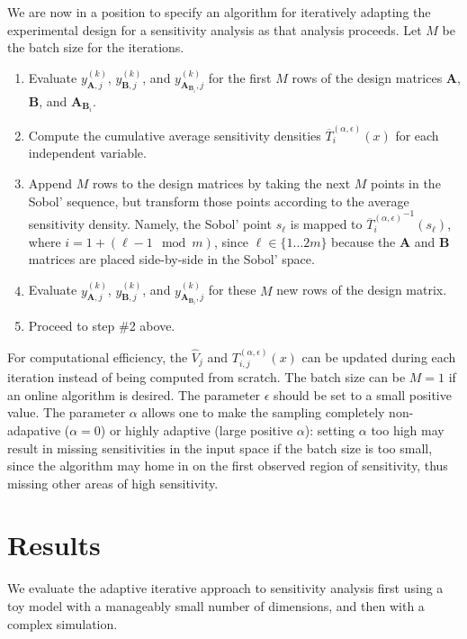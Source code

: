 \documentclass[12pt]{article}
\begin{document}
We are now in a position to specify an algorithm for iteratively adapting the experimental design for a sensitivity analysis as that analysis proceeds. Let $M$ be the batch size for the iterations.
\begin{enumerate}
    \item Evaluate $y_{\mathbf{A},j}^{(k)}$, $y_{\mathbf{B},j}^{(k)}$, and $y_{\mathbf{A}_{\mathbf{B}_i},j}^{(k)}$ for the first $M$ rows of the design matrices $\mathbf{A}$, $\mathbf{B}$, and $\mathbf{A}_{\mathbf{B}_i}$.
    \item Compute the cumulative average sensitivity densities $\overline{T}_i^{(\alpha,\epsilon)}(x)$ for each independent variable.
    \item Append $M$ rows to the design matrices by taking the next $M$ points in the Sobol' sequence, but transform those points according to the average sensitivity density. Namely, the Sobol' point $s_\ell$ is mapped to ${\overline{T}_i^{(\alpha,\epsilon)}}^{-1}(s_\ell)$, where $i = 1 + (\ell - 1 \mod m)$, since $\ell \in \{ 1 \ldots 2 m \}$ because the $\mathbf{A}$ and $\mathbf{B}$ matrices are placed side-by-side in the Sobol' space.
    \item Evaluate $y_{\mathbf{A},j}^{(k)}$, $y_{\mathbf{B},j}^{(k)}$, and $y_{\mathbf{A}_{\mathbf{B}_i},j}^{(k)}$ for these $M$ new rows of the design matrix.
    \item Proceed to step \#2 above.
\end{enumerate}
For computational efficiency, the $\hat{V}_j$ and $T_{i,j}^{(\alpha,\epsilon)}(x)$ can be updated during each iteration instead of being computed from scratch. The batch size can be $M = 1$ if an online algorithm is desired. The parameter $\epsilon$ should be set to a small positive value. The parameter $\alpha$ allows one to make the sampling completely non-adapative ($\alpha = 0$) or highly adaptive (large positive $\alpha$): setting $\alpha$ too high may result in missing sensitivities in the input space if the batch size is too small, since the algorithm may home in on the first observed region of sensitivity, thus missing other areas of high sensitivity.


\section{Results}
\label{sec:result}

We evaluate the adaptive iterative approach to sensitivity analysis first using a toy model with a manageably small number of dimensions, and then with a complex simulation.
\end{document}
